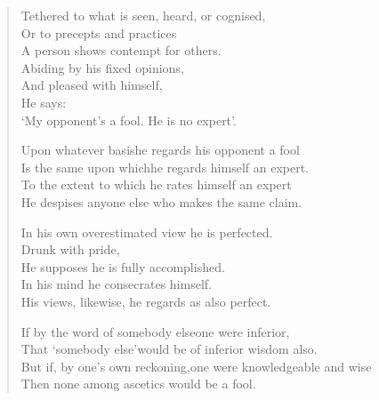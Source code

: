 \begin{verse}
 Tethered to what is seen, heard, or cognised,\\
Or to precepts and practices\\
A person shows contempt for others.\\
Abiding by his fixed opinions,\\
And pleased with himself,\\
He says:\\
`My opponent’s a fool. He is no expert'.


 Upon whatever basis\newline he regards his opponent a fool\\
Is the same upon which\newline he regards himself an expert.\\
To the extent to which he rates himself an expert\\
He despises anyone else who makes the same claim.


 In his own overestimated view he is perfected.\\
Drunk with pride,\\
He supposes he is fully accomplished.\\
In his mind he consecrates himself.\\
His views, likewise, he regards as also perfect.


 If by the word of somebody else\newline one were inferior,\\
That `somebody else'\newline would be of inferior wisdom also.\\
But if, by one's own reckoning,\newline one were knowledgeable and wise\\
Then none among ascetics would be a fool.


\end{verse}
